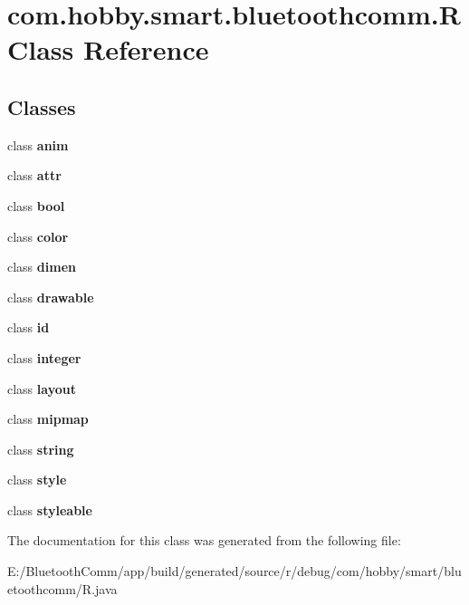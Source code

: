 \hypertarget{classcom_1_1hobby_1_1smart_1_1bluetoothcomm_1_1_r}{}\section{com.\+hobby.\+smart.\+bluetoothcomm.\+R Class Reference}
\label{classcom_1_1hobby_1_1smart_1_1bluetoothcomm_1_1_r}
\subsection*{Classes}
\begin{DoxyCompactItemize}
\item 
class {\bfseries anim}
\item 
class {\bfseries attr}
\item 
class {\bfseries bool}
\item 
class {\bfseries color}
\item 
class {\bfseries dimen}
\item 
class {\bfseries drawable}
\item 
class {\bfseries id}
\item 
class {\bfseries integer}
\item 
class {\bfseries layout}
\item 
class {\bfseries mipmap}
\item 
class {\bfseries string}
\item 
class {\bfseries style}
\item 
class {\bfseries styleable}
\end{DoxyCompactItemize}


The documentation for this class was generated from the following file\+:\begin{DoxyCompactItemize}
\item 
E\+:/\+Bluetooth\+Comm/app/build/generated/source/r/debug/com/hobby/smart/bluetoothcomm/R.\+java\end{DoxyCompactItemize}
